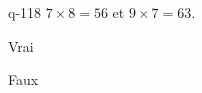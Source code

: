 \begin{truefalse}{q-118}
$7\times 8 = 56$ et $9\times 7 = 63$.
\item* Vrai
\item Faux
\end{truefalse}

